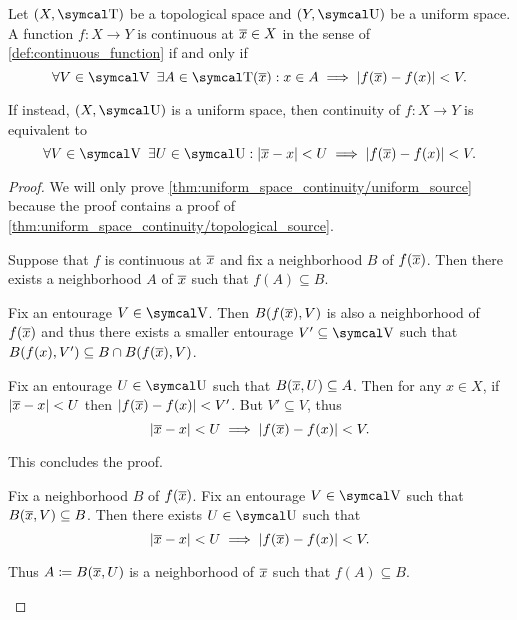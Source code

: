 \begin{proposition}\label{thm:uniform_space_continuity}
  Let \( (X, \CT) \) be a topological space and \( (Y, \CU) \) be a uniform space. A function \( f: X \to Y \) is continuous at \( \overline{x} \in X \) in the sense of \cref{def:continuous_function} if and only if
  \begin{equation}\label{thm:uniform_space_continuity/topological_source}
    \forall V \in \CV \ \exists A \in \CT(\Ol x) : x \in A \implies \Abs{f(\Ol{x}) - f(x)} < V.
  \end{equation}

  If instead, \( (X, \CU) \) is a uniform space, then continuity of \( f: X \to Y \) is equivalent to
  \begin{equation}\label{thm:uniform_space_continuity/uniform_source}
    \forall V \in \CV \ \exists U \in \CU : \Abs{\Ol{x} - x} < U \implies \Abs{f(\Ol{x}) - f(x)} < V.
  \end{equation}
\end{proposition}
\begin{proof}
  We will only prove \cref{thm:uniform_space_continuity/uniform_source} because the proof contains a proof of \cref{thm:uniform_space_continuity/topological_source}.

  \begin{description}
    \Implies Suppose that \( f \) is continuous at \( \overline{x} \) and fix a neighborhood \( B \) of \( f(\overline{x}) \). Then there exists a neighborhood \( A \) of \( \overline{x} \) such that \( f(A) \subseteq B \).

    Fix an entourage \( V \in \CV \). Then \( B(f(\overline{x}), V) \) is also a neighborhood of \( f(\overline{x}) \) and thus there exists a smaller entourage \( V' \subseteq \CV \) such that \( B(f(x), V') \subseteq B \cap B(f(\overline{x}), V) \).

    Fix an entourage \( U \in \CU \) such that \( B(\overline{x}, U) \subseteq A \). Then for any \( x \in X \), if \( \left\vert \overline{x} - x \right\vert < U \) then \( \left\vert f(\overline{x}) - f(x) \right\vert < V' \). But \( V' \subseteq V \), thus
    \begin{equation*}
      \left\vert \overline{x} - x \right\vert < U \implies \left\vert f(\overline{x}) - f(x) \right\vert < V.
    \end{equation*}

    This concludes the proof.

    \ImpliedBy Fix a neighborhood \( B \) of \( f(\overline{x}) \). Fix an entourage \( V \in \CV \) such that \( B(\overline{x}, V) \subseteq B \). Then there exists \( U \in \CU \) such that
    \begin{equation*}
      \left\vert \overline{x} - x \right\vert < U \implies \left\vert f(\overline{x}) - f(x) \right\vert < V.
    \end{equation*}

    Thus \( A \coloneqq B(\overline{x}, U) \) is a neighborhood of \( \overline{x} \) such that \( f(A) \subseteq B \).
  \end{description}
\end{proof}

